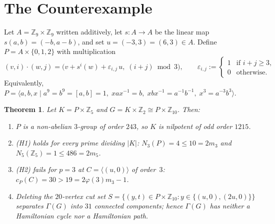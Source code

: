 \documentclass[11pt]{article}
\newtheorem{theorem}{Theorem}
\begin{document}
\section{The Counterexample}

Let $A = \mathbb{Z}_9 \times \mathbb{Z}_9$ written additively, let $s : A \to A$ be the linear map $s(a, b) = (-b, a - b)$, and set $u = (-3, 3) = (6, 3) \in A$. Define $P = A \times \{0, 1, 2\}$ with multiplication
\[
  (v, i) \cdot (w, j) = \bigl(v + s^i(w) + \varepsilon_{i, j}\, u,\; (i + j) \bmod 3\bigr), \qquad
  \varepsilon_{i, j} := \begin{cases} 1 & \text{if } i + j \ge 3, \\ 0 & \text{otherwise.} \end{cases}
\]
Equivalently, $P = \langle a, b, x \mid a^9 = b^9 = [a, b] = 1,\; xax^{-1} = b,\; xbx^{-1} = a^{-1}b^{-1},\; x^3 = a^{-3}b^3 \rangle$.

\begin{theorem}\label{thm:main}
Let $K = P \times \mathbb{Z}_5$ and $G = K \times \mathbb{Z}_2 \cong P \times \mathbb{Z}_{10}$. Then:
\begin{enumerate}
  \item $P$ is a non-abelian $3$-group of order $243$, so $K$ is nilpotent of odd order $1215$.
  \item \textnormal{(H1)} holds for every prime dividing $|K|$: $N_3(P) = 4 \le 10 = 2 m_3$ and $N_5(\mathbb{Z}_5) = 1 \le 486 = 2 m_5$.
  \item \textnormal{(H2)} fails for $p = 3$ at $C = \langle (u, 0) \rangle$ of order~$3$: $c_P(C) = 30 > 19 = 2\varphi(3)m_3 - 1$.
  \item Deleting the $20$-vertex cut set $S = \{(y, t) \in P \times \mathbb{Z}_{10} : y \in \{(u, 0), (2u, 0)\}\}$ separates $\Gamma(G)$ into $31$ connected components; hence $\Gamma(G)$ has neither a Hamiltonian cycle nor a Hamiltonian path.
\end{enumerate}
\end{theorem}
\end{document}

